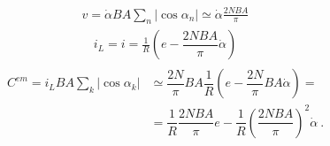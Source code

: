 \documentclass[letterpaper,10pt,english]{jupyterBook}
\begin{document}
\begin{equation*}
\begin{split}v = \dot{\alpha} B A \sum_{n} |\cos  \alpha_n| \simeq \dot{\alpha} \frac{2 N BA}{\pi}\end{split}
\end{equation*}\begin{equation*}
\begin{split}i_L = i = \frac{1}{R}\left( e - \dfrac{2 N BA}{\pi} \dot{\alpha} \right) \end{split}
\end{equation*}\begin{equation*}
\begin{split}\begin{aligned}
  C^{em} = i_L B A \sum_k \left| \cos \alpha_k \right|
  & \simeq \dfrac{2 N}{\pi} BA \dfrac{1}{R}  \left( e - \dfrac{2N}{\pi} BA \dot{\alpha} \right) = \\
  & =      \dfrac{1}{R} \dfrac{2 N BA}{\pi} e - \dfrac{1}{R} \left(\dfrac{2N BA}{\pi} \right)^2 \dot{\alpha} \ .
\end{aligned}\end{split}
\end{equation*}
\end{document}
